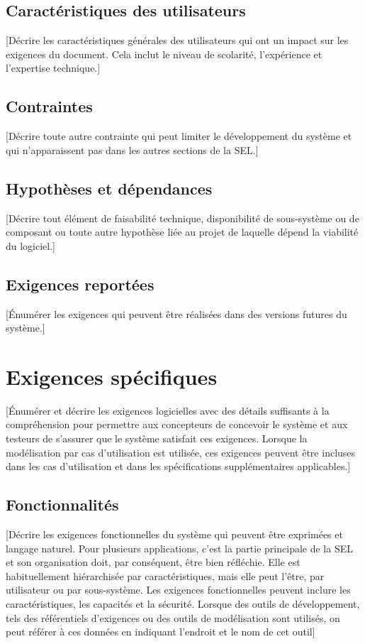 \documentclass[10pt,a4paper]{report}
\begin{document}
\subsection{Caractéristiques des utilisateurs}
[Décrire les caractéristiques générales des utilisateurs qui ont un impact sur les exigences du document. Cela inclut le niveau de scolarité, l’expérience et l’expertise technique.]

\subsection{Contraintes}
[Décrire toute autre contrainte qui peut limiter le développement du système et qui n’apparaissent pas dans les autres sections de la SEL.]

\subsection{Hypothèses et dépendances}
[Décrire tout élément de faisabilité technique, disponibilité de sous-système ou de composant ou toute autre hypothèse liée au projet de laquelle dépend la viabilité du logiciel.]

\subsection{Exigences reportées}
[Énumérer les exigences qui peuvent être réalisées dans des versions futures du système.]

\section{Exigences spécifiques}
[Énumérer et décrire les exigences logicielles avec des détails suffisants à la compréhension pour permettre aux concepteurs de concevoir le système et aux testeurs de s’assurer que le système satisfait ces exigences. Lorsque la modélisation par cas d’utilisation est utilisée, ces exigences peuvent être incluses dans les cas d’utilisation et dans les spécifications supplémentaires applicables.]

\subsection{Fonctionnalités}
[Décrire les exigences fonctionnelles du système qui peuvent être exprimées et langage naturel. Pour plusieurs applications, c’est la partie principale de la SEL et son organisation doit, par conséquent, être bien réfléchie. Elle est habituellement hiérarchisée par caractéristiques, mais elle peut l’être, par utilisateur ou par sous-système. Les exigences fonctionnelles peuvent inclure les caractéristiques, les capacités et la sécurité.
Lorsque des outils de développement, tels des référentiels d’exigences ou des outils de modélisation sont utilisés, on peut référer à ces données en indiquant l’endroit et le nom de cet outil]
\end{document}
